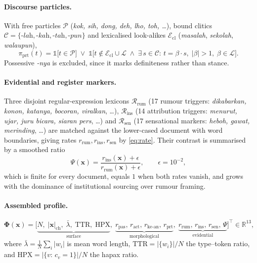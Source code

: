 \paragraph{Discourse particles.}
With free particles $\mathcal{P}$ (\emph{kok, sih, dong, deh, lho, toh, \ldots}), bound clitics
$\mathcal{C}=\{\textit{-lah},\textit{-kah},\textit{-tah},\textit{-pun}\}$ and lexicalised look-alikes
$\mathcal{E}_{\text{cl}}$ (\emph{masalah}, \emph{sekolah}, \emph{walaupun}),
\begin{equation}
\pi_{\text{prt}}(t)=\mathbb{1}\big[t\in\mathcal{P}\big]\;\vee\;
\mathbb{1}\Big[t\notin\mathcal{E}_{\text{cl}}\cup\mathcal{L}\;\wedge\;
\exists\,s\in\mathcal{C}:\,t=\beta\!\cdot\!s,\;|\beta|>1,\;\beta\in\mathcal{L}\Big].
\end{equation}
Possessive \emph{-nya} is excluded, since it marks definiteness rather than stance.

\paragraph{Evidential and register markers.}
Three disjoint regular-expression lexicons $\mathcal{R}_{\text{rum}}$ (17 rumour triggers:
\emph{dikabarkan, konon, katanya, bocoran, viralkan}, \ldots), $\mathcal{R}_{\text{ins}}$ (14 attribution
triggers: \emph{menurut, ujar, juru bicara, siaran pers}, \ldots) and $\mathcal{R}_{\text{sen}}$
(17 sensational markers: \emph{heboh, gawat, merinding}, \ldots) are matched against the lower-cased
document with word boundaries, giving rates $r_{\text{rum}},r_{\text{ins}},r_{\text{sen}}$ by
\eqref{eq:rate}. Their contrast is summarised by a smoothed ratio
\begin{equation}
\Psi(\mathbf{x})=\frac{r_{\text{ins}}(\mathbf{x})+\epsilon}{r_{\text{rum}}(\mathbf{x})+\epsilon},
\qquad \epsilon=10^{-2},
\label{eq:ratio}
\end{equation}
which is finite for every document, equals $1$ when both rates vanish, and grows with the dominance of
institutional sourcing over rumour framing.

\paragraph{Assembled profile.}
\begin{equation}
\bm{\Phi}(\mathbf{x})=\big[\underbrace{N,\;|\mathbf{x}|_{\text{ch}},\;\bar{\lambda},\;\mathrm{TTR},\;\mathrm{HPX}}_{\text{surface}},\;
\underbrace{r_{\text{pas}},\,r_{\text{act}},\,r_{\text{ke-an}},\,r_{\text{prt}}}_{\text{morphological}},\;
\underbrace{r_{\text{rum}},\,r_{\text{ins}},\,r_{\text{sen}},\,\Psi}_{\text{evidential}}\big]^{\top}\in\mathbb{R}^{13},
\end{equation}
where $\bar{\lambda}=\frac{1}{N}\sum_i|w_i|$ is mean word length,
$\mathrm{TTR}=|\{w_i\}|/N$ the type--token ratio, and
$\mathrm{HPX}=|\{v:\,c_v=1\}|/N$ the hapax ratio.

